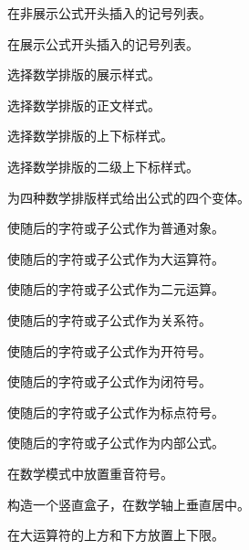 \documentclass[a4paper]{rapport3}
\newenvironment{inventory}{\begin{description}}{\end{description}}
\begin{document}
\begin{inventory}
\item [] 
      在非展示公式开头插入的记号列表。

\item []
      在展示公式开头插入的记号列表。

\item [] 
      选择数学排版的展示样式。

\item [] 
      选择数学排版的正文样式。

\item [] 
      选择数学排版的上下标样式。

\item [] 
      选择数学排版的二级上下标样式。

\item [] 
      为四种数学排版样式给出公式的四个变体。

\item [] 
      使随后的字符或子公式作为普通对象。

\item [] 
      使随后的字符或子公式作为大运算符。

\item [] 
      使随后的字符或子公式作为二元运算。

\item [] 
      使随后的字符或子公式作为关系符。

\item [] 
      使随后的字符或子公式作为开符号。

\item [] 
      使随后的字符或子公式作为闭符号。

\item [] 
      使随后的字符或子公式作为标点符号。

\item [] 
      使随后的字符或子公式作为内部公式。

\item [] 
      在数学模式中放置重音符号。

\item [] 
      构造一个竖直盒子，在数学轴上垂直居中。

\item [] 
      在大运算符的上方和下方放置上下限。


\end{inventory}
\end{document}
